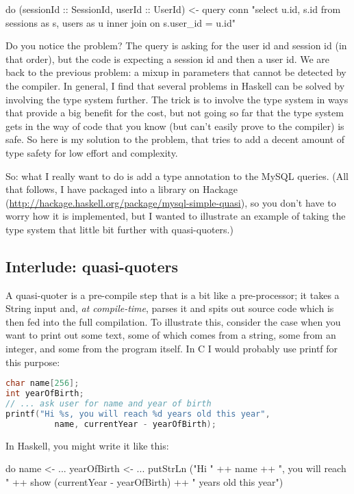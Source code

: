\documentclass{tmr}
\begin{document}
\begin{code}
do (sessionId :: SessionId, userId :: UserId) <- query conn "select
     u.id, s.id from sessions as s, users as u inner join on s.user_id = u.id"
\end{code}

Do you notice the problem?  The query is asking for the user id and session id (in that order), but the code is expecting a session id and then a user id.  We are back to the previous problem: a mixup in parameters that cannot be detected by the compiler.  In general, I find that several problems in Haskell can be solved by involving the type system further.  The trick is to involve the type system in ways that provide a big benefit for the cost, but not going so far that the type system gets in the way of code that you know (but can't easily prove to the compiler) is safe.  So here is my solution to the problem, that tries to add a decent amount of type safety for low effort and complexity.

So: what I really want to do is add a type annotation to the MySQL queries.  (All that follows, I have packaged into a library on Hackage (\url{http://hackage.haskell.org/package/mysql-simple-quasi}), so you don't have to worry how it is implemented, but I wanted to illustrate an example of taking the type system that little bit further with quasi-quoters.)

\subsection{Interlude: quasi-quoters}

A quasi-quoter is a pre-compile step that is a bit like a pre-processor; it takes a String input and, \textit{at compile-time}, parses it and spits out source code which is then fed into the full compilation.  To illustrate this, consider the case when you want to print out some text, some of which comes from a string, some from an integer, and some from the program itself.  In C I would probably use printf for this purpose:

\begin{lstlisting}[language=C]
char name[256];
int yearOfBirth;
// ... ask user for name and year of birth
printf("Hi %s, you will reach %d years old this year",
          name, currentYear - yearOfBirth);
\end{lstlisting}

In Haskell, you might write it like this:

\begin{code}
do name <- ...
   yearOfBirth <- ...
   putStrLn ("Hi " ++ name ++ ", you will reach " ++
     show (currentYear - yearOfBirth) ++ " years old this year")
\end{code}
\end{document}

